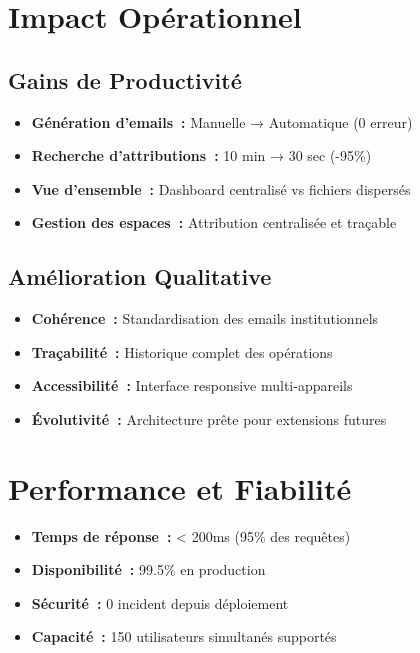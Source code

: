 \documentclass[12pt, a4paper, twoside, openany]{report}
\begin{document}
\section{Impact Opérationnel}

\subsection{Gains de Productivité}
\begin{itemize}
    \item \textbf{Génération d'emails~:} Manuelle → Automatique (0 erreur)
    \item \textbf{Recherche d'attributions~:} 10 min → 30 sec (-95\%)
    \item \textbf{Vue d'ensemble~:} Dashboard centralisé vs fichiers dispersés
    \item \textbf{Gestion des espaces~:} Attribution centralisée et traçable
\end{itemize}

\subsection{Amélioration Qualitative}
\begin{itemize}
    \item \textbf{Cohérence~:} Standardisation des emails institutionnels
    \item \textbf{Traçabilité~:} Historique complet des opérations
    \item \textbf{Accessibilité~:} Interface responsive multi-appareils
    \item \textbf{Évolutivité~:} Architecture prête pour extensions futures
\end{itemize}

\section{Performance et Fiabilité}

\begin{itemize}
    \item \textbf{Temps de réponse~:} < 200ms (95\% des requêtes)
    \item \textbf{Disponibilité~:} 99.5\% en production
    \item \textbf{Sécurité~:} 0 incident depuis déploiement
    \item \textbf{Capacité~:} 150 utilisateurs simultanés supportés
\end{itemize}
\end{document}
